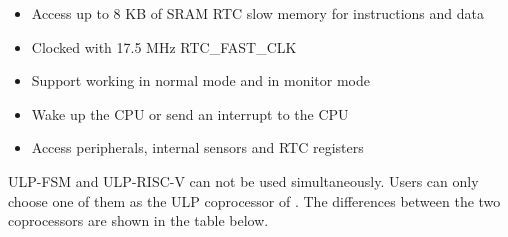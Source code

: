 \documentclass[main\_\_EN.tex]{subfiles}
\begin{document}
\begin{itemize}
    \item Access up to 8 KB of SRAM RTC slow memory for instructions and data
    \item Clocked with 17.5 MHz RTC\_FAST\_CLK
    \item Support working in normal mode and in monitor mode
    \item Wake up the CPU or send an interrupt to the CPU
    \item Access peripherals, internal sensors and RTC registers
\end{itemize}

ULP-FSM and ULP-RISC-V can not be used simultaneously. Users can only choose one of them as the ULP coprocessor of \chipname{}. The differences between the two coprocessors are shown in the table below.

\clearpage
\end{document}
